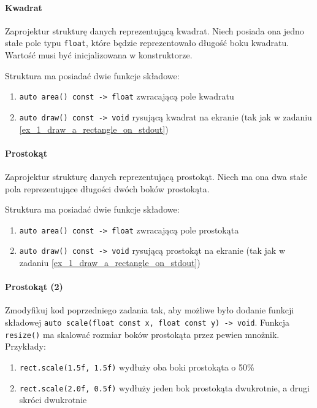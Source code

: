 \documentclass[11pt,a4paper,titlepage,onecolumn]{article}
\begin{document}
\paragraph{Kwadrat} Zaprojektur strukturę danych reprezentującą kwadrat. Niech
posiada ona jedno stałe pole typu \texttt{float}, które będzie reprezentowało
długość boku kwadratu. Wartość musi być inicjalizowana w konstruktorze.

Struktura ma posiadać dwie funkcje składowe:
\begin{enumerate}
    \item \texttt{auto area() const -> float} zwracającą pole kwadratu
    \item \texttt{auto draw() const -> void} rysującą kwadrat na ekranie (tak
        jak w zadaniu \ref{ex_1_draw_a_rectangle_on_stdout})
\end{enumerate}

\paragraph{Prostokąt} Zaprojektur strukturę danych reprezentującą prostokąt.
Niech ma ona dwa stałe pola reprezentujące długości dwóch boków prostokąta.

Struktura ma posiadać dwie funkcje składowe:
\begin{enumerate}
    \item \texttt{auto area() const -> float} zwracającą pole prostokąta
    \item \texttt{auto draw() const -> void} rysującą prostokąt na ekranie (tak
        jak w zadaniu \ref{ex_1_draw_a_rectangle_on_stdout})
\end{enumerate}

\paragraph{Prostokąt (2)} Zmodyfikuj kod poprzedniego zadania tak, aby możliwe
było dodanie funkcji składowej \texttt{auto scale(float const x, float const y) -> void}.
Funkcja \texttt{resize()} ma skalować rozmiar boków prostokąta przez pewien
mnożnik.\\
Przykłady:
\begin{enumerate}
    \item \texttt{rect.scale(1.5f, 1.5f)} wydłuży oba boki prostokąta o 50\%
    \item \texttt{rect.scale(2.0f, 0.5f)} wydłuży jeden bok prostokąta
        dwukrotnie, a drugi skróci dwukrotnie
\end{enumerate}
\end{document}
